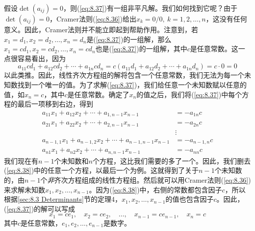    假设$\det\left(a_{ij}\right) = 0$，则(\ref{eq:8.37})有一组非平凡解。我们如何找到它呢？由于$\det\left(a_{ij}\right) = 0$，Cramer法则(\ref{eq:8.36})给出$x_k = 0/0, \: k = 1,2,\ldots,n$，这没有任何意义。因此，Cramer法则并不能立即起到帮助作用。注意到，若$x_1=d_1,x_2=d_2,\ldots,x_n=d_n$是(\ref{eq:8.37})的一组解，那么$x_1=cd_1,x_2=cd_2,\ldots,x_n=cd_n$也是(\ref{eq:8.37})的一组解，其中$c$是任意常数。这一点很容易看出，因为
    \begin{equation*}
        a_{11}cd_1 + a_{12}cd_2 + \cdots + a_{1n}cd_n = c\left(a_{11}d_1 + a_{12}d_2 + \cdots + a_{1n}d_n\right) = c\cdot 0 = 0
    \end{equation*}
    以此类推。因此，线性齐次方程组的解将包含一个任意常数，我们无法为每一个未知数找到一个唯一的值。为了求解(\ref{eq:8.37})，我们给任意一个未知数赋以任意的值，如$x_n=c$，其中$c$是任意常数。确定了$x_n$的值之后，我们将(\ref{eq:8.37})中每个方程的最后一项移到右边，得到
    \begin{equation}
        \begin{aligned}
            a_{11}x_1 + a_{12}x_2 + \cdots + a_{1,n-1}x_{n-1} &= -a_{1n}c \\
            a_{21}x_1 + a_{22}x_2 + \cdots + a_{2,n-1}x_{n-1} &= -a_{2n}c \\
            &\vdots \\
            a_{n-1,1}x_1 + a_{n-1,2}x_2 + \cdots + a_{n-1,n-1}x_{n-1} &= -a_{n-1,n}c \\
            a_{n1}x_1 + a_{n2}x_2 + \cdots + a_{n,n-1}x_{n-1} &= -a_{nn}c
        \end{aligned}
        \label{eq:8.38}
    \end{equation}
    我们现在有$n-1$个未知数和$n$个方程，这比我们需要的多了一个。因此，我们删去(\ref{eq:8.38})中的任意一个方程，以最后一个为例。这就得到了关于$n-1$个未知数的，由$n-1$个\textit{非}齐次方程组成的线性方程组。然后就可以用Cramer法则(\ref{eq:8.36})来求解未知数$x_1,x_2,\ldots,x_{n-1}$。因为(\ref{eq:8.38})中，右侧的常数都包含因子$c$，所以根据\ref{sec:8.3 Determinants}节的定理4，$x_1,x_2,\ldots,x_{n-1}$的值也包含因子$c$。因此，(\ref{eq:8.37})的解可以写成
    \begin{equation}
        x_1 = ce_1, \quad x_2 = ce_2, \quad \ldots, \quad x_{n-1} = ce_{n-1}, \quad x_n = c
        \label{eq:8.39}
    \end{equation}
    其中$c$是任意常数，$e_1,e_2,\ldots,e_{n-1}$是数字。

